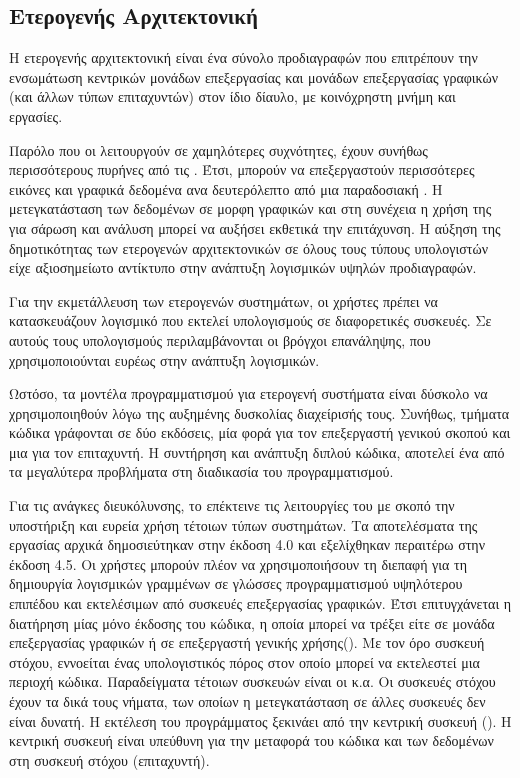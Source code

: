 \clearpage
\subsection{Ετερογενής Αρχιτεκτονική}
Η ετερογενής αρχιτεκτονική είναι ένα σύνολο προδιαγραφών που επιτρέπουν την ενσωμάτωση κεντρικών μονάδων επεξεργασίας\textbf{} και μονάδων επεξεργασίας γραφικών (και άλλων τύπων επιταχυντών) στον ίδιο δίαυλο, με κοινόχρηστη μνήμη και
εργασίες\cite{toms_hardware}.

Παρόλο που οι  λειτουργούν σε χαμηλότερες συχνότητες, έχουν συνήθως περισσότερους πυρήνες από τις . Έτσι, μπορούν να επεξεργαστούν περισσότερες εικόνες και γραφικά δεδομένα ανα δευτερόλεπτο από μια παραδοσιακή . Η μετεγκατάσταση των δεδομένων σε μορφη γραφικών και στη συνέχεια η χρήση της  για σάρωση και ανάλυση μπορεί να αυξήσει εκθετικά την επιτάχυνση. Η αύξηση της δημοτικότητας των ετερογενών αρχιτεκτονικών σε όλους τους τύπους υπολογιστών είχε
αξιοσημείωτο αντίκτυπο στην ανάπτυξη λογισμικών υψηλών προδιαγραφών.

Για την εκμετάλλευση των ετερογενών συστημάτων, οι χρήστες πρέπει να κατασκευάζουν λογισμικό που εκτελεί υπολογισμούς σε
διαφορετικές συσκευές. Σε αυτούς τους υπολογισμούς περιλαμβάνονται οι βρόγχοι επανάληψης, που χρησιμοποιούνται ευρέως
στην ανάπτυξη λογισμικών.

Ωστόσο, τα μοντέλα προγραμματισμού για ετερογενή συστήματα είναι δύσκολο να χρησιμοποιηθούν λόγω της αυξημένης δυσκολίας
διαχείρισής τους. Συνήθως, τμήματα κώδικα γράφονται σε δύο εκδόσεις, μία φορά για τον επεξεργαστή γενικού σκοπού και μια
για τον επιταχυντή. Η συντήρηση και ανάπτυξη διπλού
κώδικα, αποτελεί ένα από τα μεγαλύτερα προβλήματα στη διαδικασία του προγραμματισμού.

Για τις ανάγκες διευκόλυνσης, το \emph{} επέκτεινε τις λειτουργίες του με σκοπό την υποστήριξη και ευρεία
χρήση τέτοιων τύπων συστημάτων\cite{barbara}. Τα αποτελέσματα της εργασίας αρχικά δημοσιεύτηκαν στην έκδοση 4.0 και
εξελίχθηκαν περαιτέρω στην έκδοση 4.5. Οι χρήστες μπορούν πλέον να χρησιμοποιήσουν τη διεπαφή για τη δημιουργία
λογισμικών γραμμένων σε γλώσσες προγραμματισμού υψηλότερου επιπέδου και εκτελέσιμων από συσκευές επεξεργασίας γραφικών.
Έτσι επιτυγχάνεται η διατήρηση μίας μόνο έκδοσης του κώδικα, η οποία μπορεί να τρέξει είτε σε μονάδα επεξεργασίας
γραφικών ή σε επεξεργαστή γενικής χρήσης(\emph{}).
\clearpage
Με τον όρο συσκευή στόχου, εννοείται ένας υπολογιστικός πόρος στον οποίο μπορεί να εκτελεστεί μια περιοχή κώδικα.
Παραδείγματα τέτοιων συσκευών είναι οι \emph{} κ.α. Οι συσκευές στόχου έχουν τα δικά τους νήματα,
των οποίων η μετεγκατάσταση σε άλλες συσκευές δεν είναι δυνατή. Η εκτέλεση του προγράμματος ξεκινάει από την κεντρική
συσκευή (\emph{}). Η κεντρική συσκευή είναι υπεύθυνη για την μεταφορά του κώδικα και των δεδομένων
στη συσκευή στόχου (επιταχυντή).

